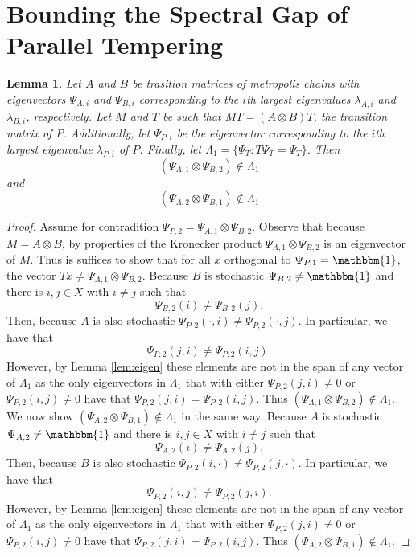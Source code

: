 \documentclass{amsart}
\newtheorem{lemma}[definition]{Lemma}
\newcommand{\1}{\mathbbm{1}}
\begin{document}
\section{Bounding the Spectral Gap of Parallel Tempering}
\begin{lemma}\label{lem:main}
    Let $A$ and $B$ be trasition matrices of metropolis chains with eigenvectors $\Psi_{A,i}$ and $\Psi_{B,i}$ corresponding to the $i$th largest eigenvalues $\lambda_{A,i}$ and $\lambda_{B,i}$, respectively. Let $M$ and $T$ be such that $MT=(A\otimes B)T$, the transition matrix of $P$. Additionally, let $\Psi_{P,i}$ be the eigenvector corresponding to the $i$th largest eigenvalue $\lambda_{P,i}$ of $P$. Finally, let $\Lambda_1=\{\Psi_T: T\Psi_T=\Psi_T\}$. Then 
    \[(\Psi_{A,1}\otimes \Psi_{B,2})\not \in \Lambda_1\]
    and 
    \[(\Psi_{A,2}\otimes \Psi_{B,1})\not \in \Lambda_1\]
\end{lemma}
\begin{proof}
    Assume for contradition $\Psi_{P,2}=\Psi_{A,1}\otimes \Psi_{B,2}$. Observe that because $M=A\otimes B$, by properties of the Kronecker product $\Psi_{A,1}\otimes \Psi_{B,2}$ is an eigenvector of $M$. Thus is suffices to show that for all $x$  orthogonal to $\Psi_{P,1}=\1$, the vector $Tx\neq \Psi_{A,1}\otimes \Psi_{B,2}$. Because $B$ is stochastic $\Psi_{B,2}\neq \1$ and there is $i,j\in X$ with $i\neq j$ such that 
    $$\Psi_{B,2}(i)\neq \Psi_{B,2}(j).$$ 
    Then, because $A$ is also stochastic $\Psi_{P,2}(\cdot, i)\neq \Psi_{P,2}(\cdot, j)$. In particular, we have that 
    $$\Psi_{P,2}(j, i)\neq \Psi_{P,2}(i, j).$$
    However, by Lemma \ref{lem:eigen} these elements are not in the span of any vector of $\Lambda_1$ as the only eigenvectors in $\Lambda_1$ that with either $\Psi_{P,2}(j, i)\neq 0$ or $\Psi_{P,2}(i, j)\neq 0$ have that $\Psi_{P,2}(j, i)=\Psi_{P,2}(i, j)$. Thus $(\Psi_{A,1}\otimes \Psi_{B,2})\not \in \Lambda_1$. We now show $(\Psi_{A,2}\otimes \Psi_{B,1})\not \in \Lambda_1$ in the same way. Because $A$ is stochastic $\Psi_{A,2}\neq \1$ and there is $i,j\in X$ with $i\neq j$ such that 
    $$\Psi_{A,2}(i)\neq \Psi_{A,2}(j).$$ 
    Then, because $B$ is also stochastic $\Psi_{P,2}(i,\cdot )\neq \Psi_{P,2}(j, \cdot)$. In particular, we have that 
    $$\Psi_{P,2}(i,j)\neq \Psi_{P,2}(j, i).$$
    However, by Lemma \ref{lem:eigen} these elements are not in the span of any vector of $\Lambda_1$ as the only eigenvectors in $\Lambda_1$ that with either $\Psi_{P,2}(j, i)\neq 0$ or $\Psi_{P,2}(i, j)\neq 0$ have that $\Psi_{P,2}(j, i)=\Psi_{P,2}(i, j)$. Thus $(\Psi_{A,2}\otimes \Psi_{B,1})\not \in \Lambda_1$.
\end{proof}
\end{document}
